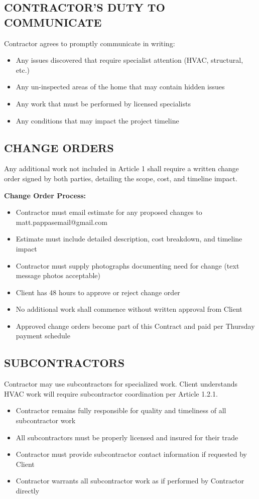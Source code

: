 \documentclass[10pt,letterpaper]{article}
\begin{document}
\subsection{CONTRACTOR'S DUTY TO COMMUNICATE}
Contractor agrees to promptly communicate in writing:
\begin{itemize}[leftmargin=*]
\item Any issues discovered that require specialist attention (HVAC, structural, etc.)
\item Any un-inspected areas of the home that may contain hidden issues
\item Any work that must be performed by licensed specialists
\item Any conditions that may impact the project timeline
\end{itemize}

\subsection{CHANGE ORDERS}
Any additional work not included in Article 1 shall require a written change order signed by both parties, detailing the scope, cost, and timeline impact.

\noindent\textbf{Change Order Process:}
\begin{itemize}[leftmargin=*]
\item Contractor must email estimate for any proposed changes to matt.pappasemail@gmail.com
\item Estimate must include detailed description, cost breakdown, and timeline impact
\item Contractor must supply photographs documenting need for change (text message photos acceptable)
\item Client has 48 hours to approve or reject change order
\item No additional work shall commence without written approval from Client
\item Approved change orders become part of this Contract and paid per Thursday payment schedule
\end{itemize}

\subsection{SUBCONTRACTORS}
Contractor may use subcontractors for specialized work. Client understands HVAC work will require subcontractor coordination per Article 1.2.1.
\begin{itemize}[leftmargin=*]
\item Contractor remains fully responsible for quality and timeliness of all subcontractor work
\item All subcontractors must be properly licensed and insured for their trade
\item Contractor must provide subcontractor contact information if requested by Client
\item Contractor warrants all subcontractor work as if performed by Contractor directly
\end{itemize}
\end{document}
